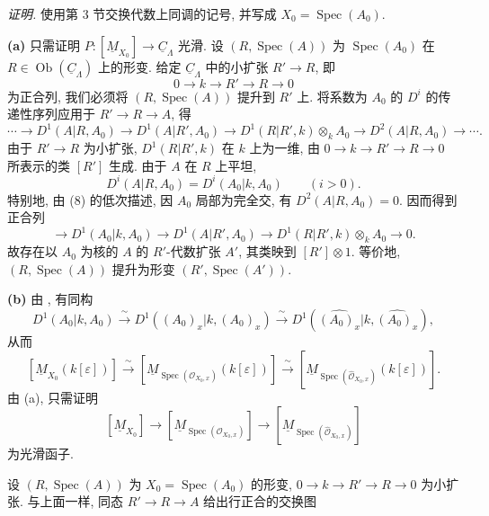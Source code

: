 \medskip
\noindent\textit{证明.}
使用第 3 节交换代数上同调的记号, 并写成 $X_0=\operatorname{Spec}(A_0)$.


\smallskip
\noindent\textbf{(a)}
只需证明 $P:[\underline M_{X_0}]\longrightarrow\underline C_\Lambda$ 光滑. 设 $(R,\operatorname{Spec}(A))$ 为 $\operatorname{Spec}(A_0)$ 在 $R\in\operatorname{Ob}(\underline C_\Lambda)$ 上的形变. 给定 $\underline C_\Lambda$ 中的小扩张 $R'\longrightarrow R$, 即
\[
0\longrightarrow k\longrightarrow R'\longrightarrow R
\longrightarrow0
\]
为正合列, 我们必须将 $(R,\operatorname{Spec}(A))$ 提升到 $R'$ 上. 将系数为 $A_0$ 的 $D^i$ 的传递性序列应用于 $R'\longrightarrow R\longrightarrow A$, 得
\[
\cdots\longrightarrow D^1(A|R,A_0)
\longrightarrow D^1(A|R',A_0)
\longrightarrow D^1(R|R',k)\otimes_kA_0
\longrightarrow D^2(A|R,A_0)\longrightarrow\cdots .
\]
由于 $R'\longrightarrow R$ 为小扩张, $D^1(R|R',k)$ 在 $k$ 上为一维, 由 $0\longrightarrow k\longrightarrow R'\longrightarrow R
\longrightarrow0$ 所表示的类 $[R']$ 生成. 由于 $A$ 在 $R$ 上平坦,
\[
D^i(A|R,A_0)=D^i(A_0|k,A_0)
\qquad(i>0).
\]
特别地, 由 (8) 的低次描述, 因 $A_0$ 局部为完全交, 有 $D^2(A|R,A_0)=0$. 因而得到正合列
\[
\longrightarrow D^1(A_0|k,A_0)
\longrightarrow D^1(A|R',A_0)
\longrightarrow D^1(R|R',k)\otimes_kA_0
\longrightarrow0.
\]
故存在以 $A_0$ 为核的 $A$ 的 $R'$-代数扩张 $A'$, 其类映到 $[R']\otimes1$. 等价地, $(R,\operatorname{Spec}(A))$ 提升为形变 $(R',\operatorname{Spec}(A'))$.

\smallskip
\noindent\textbf{(b)}
由 , 有同构
\[
D^1(A_0|k,A_0)
\xrightarrow{\ \sim\ }
D^1((A_0)_x|k,(A_0)_x)
\xrightarrow{\ \sim\ }
D^1(\widehat{(A_0)_x}|k,\widehat{(A_0)_x}),
\]
从而
\[
[\underline M_{X_0}(k[\varepsilon])]
\xrightarrow{\ \sim\ }
[\underline M_{\operatorname{Spec}(\mathcal O_{X_0,x})}
 (k[\varepsilon])]
\xrightarrow{\ \sim\ }
[\underline M_{\operatorname{Spec}(\widehat{\mathcal O}_{X_0,x})}
 (k[\varepsilon])].
\]
由 (a), 只需证明
\[
[\underline M_{X_0}]
\longrightarrow
[\underline M_{\operatorname{Spec}(\mathcal O_{X_0,x})}]
\longrightarrow
[\underline M_{\operatorname{Spec}(\widehat{\mathcal O}_{X_0,x})}]
\]
为光滑函子.

设 $(R,\operatorname{Spec}(A))$ 为 $X_0=\operatorname{Spec}(A_0)$ 的形变, $0\longrightarrow k\longrightarrow R'\longrightarrow R
\longrightarrow0$ 为小扩张. 与上面一样, 同态 $R'\longrightarrow R\longrightarrow A$ 给出行正合的交换图

